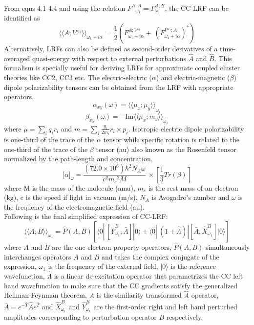 \\
From eqns 4.1-4.4 and using the relation $F^{B;A}_{-\omega_1}=F^{A;B}_{\omega_1}$,
the CC-LRF can be identified as
\begin{equation}
{\langle\langle A;V^{\omega_1} \rangle\rangle}_{\omega_1 + i\alpha} \
= \frac{1}{2}( F^{A;V^{\omega_1}}_{\omega_1 + i\alpha} + \
(F^{V^{\omega_1};A}_{\omega_1 + i\alpha})^{*})
\end{equation}
Alternatively, LRFs can also be defined as second-order derivatives 
of a time-averaged quasi-energy with respect to external perturbations $\hat{A}$ and
$\hat{B}$. This formalism is specially useful for deriving LRFs for approximate
coupled cluster theories like CC2, CC3 etc. 
The electric-electric ($\alpha$) and electric-magnetic ($\beta$)
dipole polarizability tensors can be obtained from the LRF with appropriate
operators,
\begin{equation}
\alpha_{xy}(\omega) = {\langle\langle \mu_x;\mu_y\rangle\rangle}_{\omega_1}
\end{equation}
\begin{equation}
\beta_{xy}(\omega) = {-\text{Im} \langle\langle \mu_x;m_y\rangle\rangle}_{\omega_1}
\end{equation}
where $\mu = \sum_i q_i r_i $ and $m = \sum_i \frac{q_i}{2m_i} r_i \times p_i$. 
Isotropic electric dipole polarizability is one-third of the trace of the $\alpha$ tensor 
while specific rotation is related to the one-third of the trace 
of the $\beta$ tensor (au) also known as the Rosenfeld tensor normalized
by the path-length and concentration\cite{},
\begin{equation}
{\lbrack\alpha\rbrack}_{\omega} = \frac{(72.0 \times 10^6){\hbar}^2 N_A\omega}{c^2{m_e}^2 M}
\ \times \left[ \frac{1}{3}Tr(\beta)\right]
\end{equation}
where M is the mass of the molecule (amu), $m_e$ is the rest mass of an electron
(kg), c is the speed if light in vacuum (m/s), $N_A$ is Avogadro's number and $\omega$
is the frequency of the electromagnetic field (au). \\
Following is the final simplified expression of CC-LRF\cite{}: 
\begin{equation}
{\langle\langle A;B\rangle\rangle}_{\omega_1} =  \hat{P}(A,B)[\langle 0 | \
[\hat{Y}^{B}_{\omega_1}, \bar{A}]|0\rangle + \langle 0 | \
(1 + \hat{\Lambda})|[\bar{A},\hat{X}^{B}_{\omega_1}]|0\rangle]
\end{equation}
where $A$ and $B$ are the one electron property operators,
$\hat{P}(A,B)$ simultaneously interchanges operators $A$ and $B$
and takes the complex conjugate of the expression,
$\omega_1$ is the frequency of the external field, 
$|0\rangle$ is the reference wavefunction, $\hat{\Lambda}$ is 
a linear de-excitation operator that parametrizes the CC left hand 
wavefunction to make sure that the CC gradients satisfy the 
generalized Hellman-Feynman theorem\cite{}, $\bar{A}$ is the 
similarity transformed $\hat{A}$ operator, $\bar{A} = e^{-\hat{T}}\hat{A}e^{\hat{T}}$
and $\hat{X}^{B}_{\omega_1}$ and $\hat{Y}^{B}_{\omega_1}$ are the first-order 
right and left hand perturbed amplitudes corresponding to perturbation operator 
$B$ respectively. 
